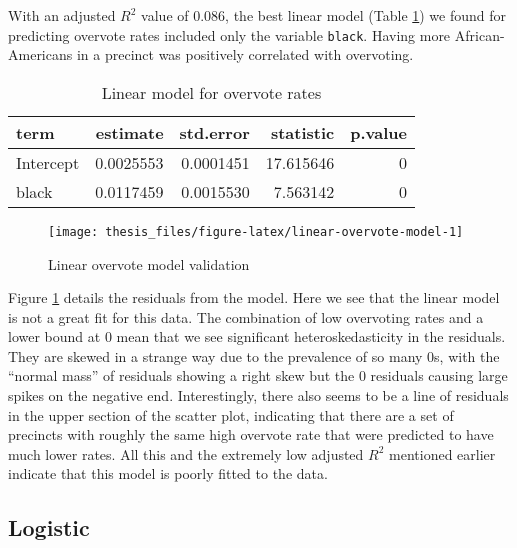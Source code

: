 \documentclass[12pt,twoside]{reedthesis}
\begin{document}
With an adjusted \(R^2\) value of 0.086, the best linear model (Table \ref{tab:linear-overvote-model}) we found for predicting overvote rates included only the variable \texttt{black}. Having more African-Americans in a precinct was positively correlated with overvoting.
\begin{table}[t]

\caption[Linear overvote model]{\label{tab:linear-overvote-model}Linear model for overvote rates}
\centering
\begin{tabular}{lrrrr}
\toprule
term & estimate & std.error & statistic & p.value\\
\midrule
Intercept & 0.0025553 & 0.0001451 & 17.615646 & 0\\
black & 0.0117459 & 0.0015530 & 7.563142 & 0\\
\bottomrule
\end{tabular}
\end{table}
\begin{figure}
\texttt{[image: thesis\_files/figure-latex/linear-overvote-model-1]} \caption{Linear overvote model validation}\label{fig:linear-overvote-model}
\end{figure}
Figure \ref{fig:linear-overvote-model} details the residuals from the model. Here we see that the linear model is not a great fit for this data. The combination of low overvoting rates and a lower bound at 0 mean that we see significant heteroskedasticity in the residuals. They are skewed in a strange way due to the prevalence of so many 0s, with the ``normal mass'' of residuals showing a right skew but the 0 residuals causing large spikes on the negative end. Interestingly, there also seems to be a line of residuals in the upper section of the scatter plot, indicating that there are a set of precincts with roughly the same high overvote rate that were predicted to have much lower rates. All this and the extremely low adjusted \(R^2\) mentioned earlier indicate that this model is poorly fitted to the data.

\hypertarget{logistic-1}{%
\subsection{Logistic}\label{logistic-1}}
\end{document}
